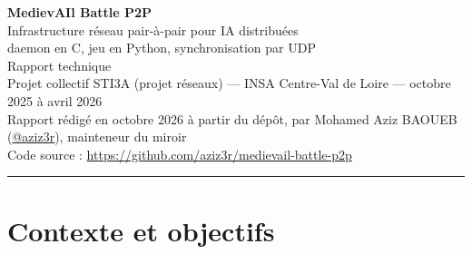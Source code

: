 \documentclass[11pt,a4paper]{article}
\begin{document}
\begin{center}
{\Huge\bfseries\color{accent} MedievAIl Battle P2P}\\[6pt]
{\Large Infrastructure r\'eseau pair-\`a-pair pour IA distribu\'ees\\[2pt] daemon en C, jeu en Python, synchronisation par UDP}\\[10pt]
{\large Rapport technique}\\[10pt]
{\small Projet collectif STI3A (projet r\'eseaux) --- INSA Centre-Val de Loire --- octobre 2025 \`a avril 2026\\
Rapport r\'edig\'e en octobre 2026 \`a partir du d\'ep\^ot, par Mohamed Aziz BAOUEB (\href{https://github.com/aziz3r}{@aziz3r}), mainteneur du miroir\\[2pt]
Code source : \url{https://github.com/aziz3r/medievail-battle-p2p}}
\end{center}
\vspace{-2pt}
\noindent\rule{\linewidth}{0.8pt}

\begin{abstract}\noindent
MedievAIl Battle P2P prolonge le jeu de bataille m\'edi\'eval d\'evelopp\'e pour le projet Python de la formation : deux joueurs, chacun avec son
arm\'ee et son IA, s'affrontent sans serveur central. Chaque machine ex\'ecute deux processus : le jeu (Python, pygame) et un daemon r\'eseau
\'ecrit en C qui relaie les messages en UDP vers le pair. Ce rapport d\'ecrit l'architecture, le protocole de lobby et de synchronisation,
l'historique du d\'eveloppement, puis une exp\'erience r\'ealis\'ee en octobre 2026 : une partie compl\`ete entre deux instances locales, enregistr\'ee
c\^ote \`a c\^ote. L'exp\'erience montre un fonctionnement de bout en bout (lobby, placement, combat) mais aussi une divergence des deux vues en fin de
bataille, et r\'ev\`ele une limite propre \`a macOS : le daemon d'origine perd les paquets de plus de 9\,Ko. Le rapport confronte enfin la
documentation au code et propose des pistes d'am\'elioration. Le projet est une \oe uvre collective ; l'historique Git d'origine est conserv\'e.
\end{abstract}

\setcounter{tocdepth}{1}
\tableofcontents

\section{Contexte et objectifs}
\end{document}
